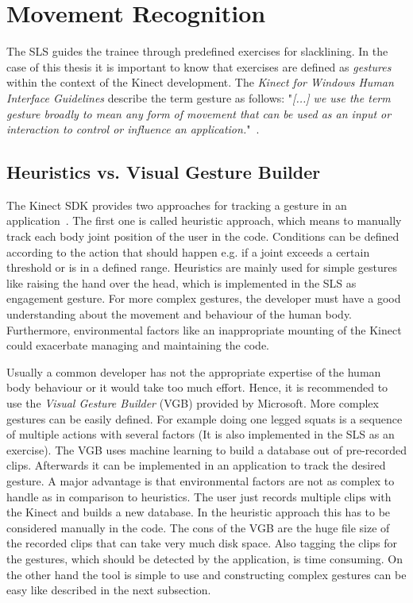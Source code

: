 \section{Movement Recognition}\label{5_3_movementRecognition}
The SLS guides the trainee through predefined exercises for slacklining. In the case of this thesis it is important to know that exercises are defined as \textit{gestures} within the context of the Kinect development. The \textit{Kinect for Windows Human Interface Guidelines} describe the term gesture as follows: "\textit{[...] we use the term gesture broadly to mean any form of movement that can be used as an input or interaction to control or influence an application.}"~\cite{MicrosoftHIG2014-mh}.

\subsection{Heuristics vs. Visual Gesture Builder}
The Kinect SDK provides two approaches for tracking a gesture in an application~\cite{MicrosoftVGB}.
The first one is called heuristic approach, which means to manually track each body joint position of the user in the code.
Conditions can be defined according to the action that should happen e.g. if a joint exceeds a certain threshold or is in a defined range.
Heuristics are mainly used for simple gestures like raising the hand over the head, which is implemented in the SLS as engagement gesture.
For more complex gestures, the developer must have a good understanding about the movement and behaviour of the human body.
Furthermore, environmental factors like an inappropriate mounting of the Kinect could exacerbate managing and maintaining the code.

Usually a common developer has not the appropriate expertise of the human body behaviour or it would take too much effort.
Hence, it is recommended to use the \textit{Visual Gesture Builder} (VGB) provided by Microsoft. 
More complex gestures can be easily defined. For example doing one legged squats is a sequence of multiple actions with several factors (It is also implemented in the SLS as an exercise).
The VGB uses machine learning to build a database out of pre-recorded clips.
Afterwards it can be implemented in an application to track the desired gesture.
A major advantage is that environmental factors are not as complex to handle as in comparison to heuristics.
The user just records multiple clips with the Kinect and builds a new database.
In the heuristic approach this has to be considered manually in the code.
The cons of the VGB are the huge file size of the recorded clips that can take very much disk space.
Also tagging the clips for the gestures, which should be detected by the application, is time consuming. 
On the other hand the tool is simple to use and constructing complex gestures can be easy like described in the next subsection.


